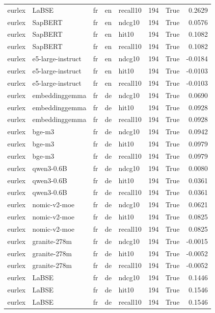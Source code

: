 \begin{tabular}{lllllrrr}
eurlex & LaBSE & fr & en & recall10 & 194 & True & 0.2629 \\
eurlex & SapBERT & fr & en & ndcg10 & 194 & True & 0.0576 \\
eurlex & SapBERT & fr & en & hit10 & 194 & True & 0.1082 \\
eurlex & SapBERT & fr & en & recall10 & 194 & True & 0.1082 \\
eurlex & e5-large-instruct & fr & en & ndcg10 & 194 & True & -0.0184 \\
eurlex & e5-large-instruct & fr & en & hit10 & 194 & True & -0.0103 \\
eurlex & e5-large-instruct & fr & en & recall10 & 194 & True & -0.0103 \\
eurlex & embeddinggemma & fr & de & ndcg10 & 194 & True & 0.0690 \\
eurlex & embeddinggemma & fr & de & hit10 & 194 & True & 0.0928 \\
eurlex & embeddinggemma & fr & de & recall10 & 194 & True & 0.0928 \\
eurlex & bge-m3 & fr & de & ndcg10 & 194 & True & 0.0942 \\
eurlex & bge-m3 & fr & de & hit10 & 194 & True & 0.0979 \\
eurlex & bge-m3 & fr & de & recall10 & 194 & True & 0.0979 \\
eurlex & qwen3-0.6B & fr & de & ndcg10 & 194 & True & 0.0080 \\
eurlex & qwen3-0.6B & fr & de & hit10 & 194 & True & 0.0361 \\
eurlex & qwen3-0.6B & fr & de & recall10 & 194 & True & 0.0361 \\
eurlex & nomic-v2-moe & fr & de & ndcg10 & 194 & True & 0.0621 \\
eurlex & nomic-v2-moe & fr & de & hit10 & 194 & True & 0.0825 \\
eurlex & nomic-v2-moe & fr & de & recall10 & 194 & True & 0.0825 \\
eurlex & granite-278m & fr & de & ndcg10 & 194 & True & -0.0015 \\
eurlex & granite-278m & fr & de & hit10 & 194 & True & -0.0052 \\
eurlex & granite-278m & fr & de & recall10 & 194 & True & -0.0052 \\
eurlex & LaBSE & fr & de & ndcg10 & 194 & True & 0.1446 \\
eurlex & LaBSE & fr & de & hit10 & 194 & True & 0.1546 \\
eurlex & LaBSE & fr & de & recall10 & 194 & True & 0.1546 \\

\end{tabular}
